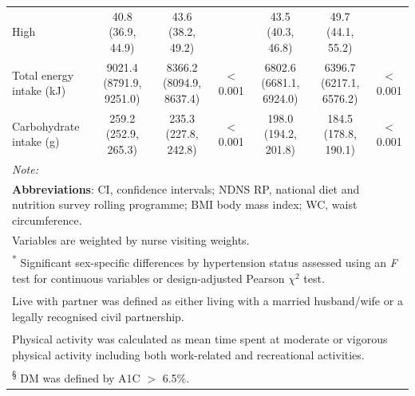 \begin{table}
\begin{tabular}[t]{lcccccc}
		\hspace{1em}High & 40.8 (36.9, 44.9) & 43.6 (38.2, 49.2) &  & 43.5 (40.3, 46.8) & 49.7 (44.1, 55.2) & \\
		Total energy intake (kJ) & 9021.4 (8791.9, 9251.0) & 8366.2 (8094.9, 8637.4) & < 0.001 & 6802.6 (6681.1, 6924.0) & 6396.7 (6217.1, 6576.2) & < 0.001\\
		Carbohydrate intake (g) & 259.2 (252.9, 265.3) & 235.3 (227.8, 242.8) & < 0.001 & 198.0 (194.2, 201.8) & 184.5 (178.8, 190.1) & < 0.001\\
		\bottomrule
		\multicolumn{7}{l}{{\scriptsize \textit{Note: }}}\\
		\multicolumn{7}{l}{{\scriptsize \textbf{Abbreviations}: CI, confidence intervals; NDNS RP, national diet and nutrition survey rolling programme; BMI body mass index; WC, waist circumference.}}\\
		\multicolumn{7}{l}{{\scriptsize Variables are weighted by nurse visiting weights.}}\\
		\multicolumn{7}{l}{{\scriptsize \textsuperscript{*} Significant sex-specific differences by hypertension status assessed using an \textit{F} test for continuous variables or design-adjusted Pearson $\chi^2$ test.}}\\
		\multicolumn{7}{l}{{\scriptsize \textsuperscript{\ddag} Live with partner was defined as either living with a married husband/wife or a legally recognised civil partnership.}}\\
		\multicolumn{7}{l}{{\scriptsize \textsuperscript{\dag} Physical activity was calculated as mean time spent at moderate or vigorous physical activity including both work-related and recreational activities.}}\\
		\multicolumn{7}{l}{{\scriptsize \textsuperscript{\S}  DM was defined by A1C $>$ 6.5\%.}}
	\end{tabular}
\end{table}




